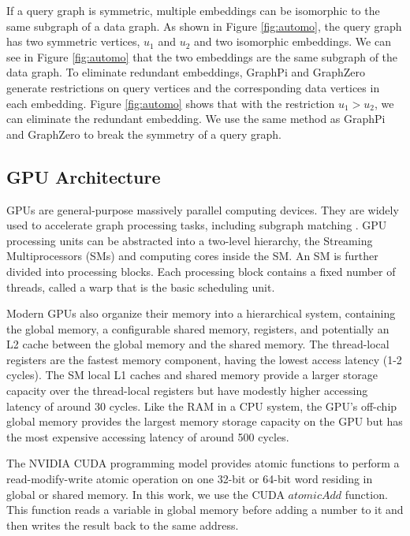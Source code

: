 If a query graph is symmetric, multiple embeddings can be isomorphic to the same subgraph of a data graph. As shown in Figure \ref{fig:automo}, the query graph has two symmetric vertices, $u_1$ and $u_2$ and two isomorphic embeddings. We can see in Figure \ref{fig:automo} that the two embeddings are the same subgraph of the data graph. To eliminate redundant embeddings, GraphPi \cite{shi2020graphpi} and GraphZero \cite{mawhirter2019graphzero} generate restrictions on query vertices and the corresponding data vertices in each embedding. Figure \ref{fig:automo} shows that with the restriction $u_1 > u_2$, we can eliminate the redundant embedding. We use the same method as GraphPi and GraphZero to break the symmetry of a query graph.

\subsection{GPU Architecture}
GPUs are general-purpose massively parallel computing devices. They are widely used to accelerate graph processing tasks, including
subgraph matching \FIXME{\cite{}}. GPU processing units can be abstracted into a two-level hierarchy, the Streaming Multiprocessors (SMs)
and computing cores inside the SM. An SM is further divided into processing blocks. Each processing block contains a fixed number of
threads, called a warp that is the basic scheduling unit.

Modern GPUs also organize their memory into a hierarchical system, containing the global memory, a configurable shared memory, registers,
and potentially an L2 cache between the global memory and the shared memory. The thread-local registers are the fastest memory component,
having the lowest access latency (1-2 cycles). The SM local L1 caches and shared memory provide a larger storage capacity over the
thread-local registers but have modestly higher accessing latency of around 30 cycles. Like the RAM in a CPU system, the GPU’s off-chip
global memory provides the largest memory storage capacity on the GPU but has the most expensive accessing latency of around 500 cycles.

The NVIDIA CUDA programming model provides atomic functions to perform a read-modify-write atomic operation on one 32-bit or 64-bit word
residing in global or shared memory. In this work, we use the CUDA $atomicAdd$ function. This function reads a variable in global memory
before adding a number to it and then writes the result back to the same address.



